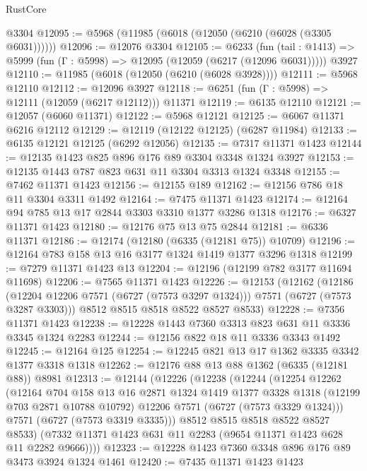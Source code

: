 \begin{lexlean}{RustCore}
\begin{coremodule}
    @3304
@12095 := @5968 (@11985 (@6018 (@12050 (@6210 (@6028 (@3305 @6031))))))
@12096 := @12076 @3304
@12105 := @6233
    (fun (tail : @1413) => @5999 (fun (Γ : @5998) => @12095 (@12059 (@6217 (@12096 @6031)))))
    @3927
@12110 := @11985 (@6018 (@12050 (@6210 (@6028 @3928))))
@12111 := @5968 @12110
@12112 := @12096 @3927
@12118 := @6251 (fun (Γ : @5998) => @12111 (@12059 (@6217 @12112))) @11371
@12119 := @6135 @12110
@12121 := @12057 (@6060 @11371)
@12122 := @5968 @12121
@12125 := @6067 @11371 @6216 @12112
@12129 := @12119 (@12122 @12125) (@6287 @11984)
@12133 := @6135 @12121 @12125 (@6292 @12056)
@12135 := @7317 @11371 @1423
@12144 := @12135 @1423 @825 @896 @176 @89 @3304 @3348 @1324 @3927
@12153 := @12135 @1443 @787 @823 @631 @11 @3304 @3313 @1324 @3348
@12155 := @7462 @11371 @1423
@12156 := @12155 @189
@12162 := @12156 @786 @18 @11 @3304 @3311 @1492
@12164 := @7475 @11371 @1423
@12174 := @12164 @94 @785 @13 @17 @2844 @3303 @3310 @1377 @3286 @1318
@12176 := @6327 @11371 @1423
@12180 := @12176 @75 @13 @75 @2844
@12181 := @6336 @11371
@12186 := @12174 (@12180 (@6335 (@12181 @75)) @10709)
@12196 := @12164 @783 @158 @13 @16 @3177 @1324 @1419 @1377 @3296 @1318
@12199 := @7279 @11371 @1423 @13
@12204 := @12196 (@12199 @782 @3177 @11694 @11698)
@12206 := @7565 @11371 @1423
@12226 := @12153
    (@12162
      (@12186 (@12204 @12206 @7571 (@6727 (@7573 @3297 @1324))) @7571 (@6727 (@7573 @3287 @3303)))
      @8512
      @8515
      @8518
      @8522
      @8527
      @8533)
@12228 := @7356 @11371 @1423
@12238 := @12228 @1443 @7360 @3313 @823 @631 @11 @3336 @3345 @1324 @2283
@12244 := @12156 @822 @18 @11 @3336 @3343 @1492
@12245 := @12164 @125
@12254 := @12245 @821 @13 @17 @1362 @3335 @3342 @1377 @3318 @1318
@12262 := @12176 @88 @13 @88 @1362 (@6335 (@12181 @88)) @8981
@12313 := @12144
    (@12226
      (@12238
        (@12244
          (@12254
            @12262
            (@12164
              @704
              @158
              @13
              @16
              @2871
              @1324
              @1419
              @1377
              @3328
              @1318
              (@12199 @703 @2871 @10788 @10792)
              @12206
              @7571
              (@6727 (@7573 @3329 @1324)))
            @7571
            (@6727 (@7573 @3319 @3335)))
          @8512
          @8515
          @8518
          @8522
          @8527
          @8533)
        (@7332 @11371 @1423 @631 @11 @2283 (@9654 @11371 @1423 @628 @11 @2282 @9666))))
@12323 := @12228 @1423 @7360 @3348 @896 @176 @89 @3473 @3924 @1324 @1461
@12420 := @7435
    @11371
    @1423
    @1423

\end{coremodule}
\end{lexlean}
